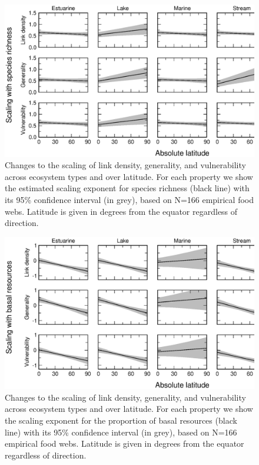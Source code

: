 \documentclass[12pt]{article}
\begin{document}
\newpage


\begin{figure}[h]
\centerline{\includegraphics*[width=.8\textwidth]{Figures/by_TL/marginal/S_marginal_latitude_proportions.eps}}
\caption{Changes to the scaling of link density, generality, and vulnerability across ecosystem
types and over latitude. For each property we show the estimated scaling exponent for species richness (black
line) with its 95\% confidence interval (in grey),
based on N=166 empirical food webs. Latitude is 
given in degrees from the equator
regardless of direction.}
\label{S}
\end{figure}


\begin{figure}[!h]
\centerline{\includegraphics*[width=.8\textwidth]{Figures/by_TL/marginal/B_marginal_latitude_proportions.eps}}
\caption{Changes to the scaling of link density, generality, and vulnerability across ecosystem
types and over latitude. For each property we show the scaling exponent for the proportion of
basal resources (black line) with its 95\% confidence interval (in grey), based on N=166 
empirical food webs. Latitude is given in degrees
from the equator regardless of direction.}
\label{B}
\end{figure}
\end{document}
